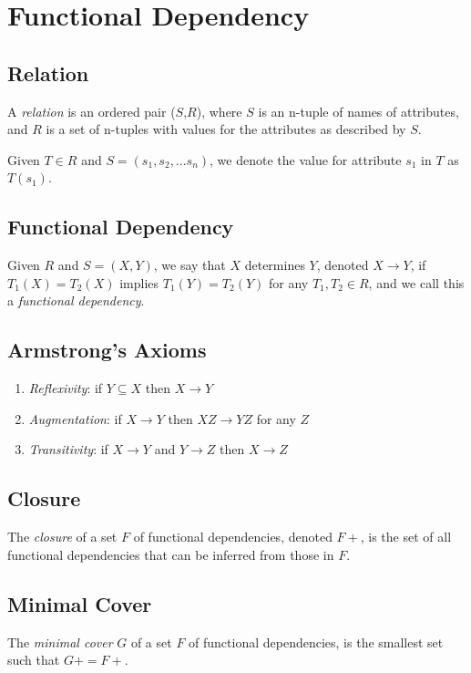 \chapter{Functional Dependency}

\section{Relation}

\begin{definition}
A \emph{relation} is an ordered pair ($S$,$R$), where $S$ is an
n-tuple of names of attributes, and $R$ is a set of n-tuples with
values for the attributes as described by $S$.
\end{definition}

Given $T \in R$ and $S = (s_1,s_2,...s_n)$, we denote the value for
attribute $s_1$ in $T$ as $T(s_1)$.

\section{Functional Dependency}

\begin{definition}

Given $R$ and $S = (X,Y)$, we say that $X$ determines $Y$, denoted $X
\rightarrow Y$, if $T_1(X) = T_2(X)$ implies $T_1(Y) = T_2(Y)$ for any
$T_1,T_2 \in R$, and we call this a \emph{functional dependency}.

\end{definition}

\section{Armstrong's Axioms}

\begin{enumerate}
\item \emph{Reflexivity}: if $Y \subseteq X$ then $X \rightarrow Y$
\item \emph{Augmentation}: if $X \rightarrow Y$ then $XZ \rightarrow YZ$ for any $Z$
\item \emph{Transitivity}: if $X \rightarrow Y$ and $Y \rightarrow Z$ then $X \rightarrow Z$
\end{enumerate}

\section{Closure}

\begin{definition}

The \emph{closure} of a set $F$ of functional dependencies, denoted $F+$, is
the set of all functional dependencies that can be inferred from those
in $F$.

\end{definition}

\section{Minimal Cover}

\begin{definition}

The \emph{minimal cover} $G$ of a set $F$ of functional dependencies,
is the smallest set such that $G+ = F+$.

\end{definition}
